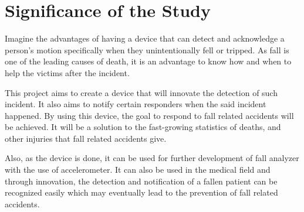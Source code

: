 \section{Significance of the Study}

Imagine the advantages of having a device that can detect and acknowledge a person’s motion specifically when they unintentionally fell or tripped. As fall is one of the leading causes of death, it is an advantage to know how and when to help the victims after the incident.

This project aims to create a device that will innovate the detection of such incident. It also aims to notify certain responders when the said incident happened. By using this device, the goal to respond to fall related accidents will be achieved. It will be a solution to the fast-growing statistics of deaths, and other injuries that fall related accidents give.

Also, as the device is done, it can be used for further development of fall analyzer with the use of accelerometer. It can also be used in the medical field and through innovation, the detection and notification of a fallen patient can be recognized easily which may eventually lead to the prevention of fall related accidents.

